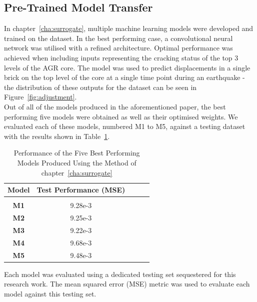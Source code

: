 \subsection{Pre-Trained Model Transfer} \label{TransferModels}

In chapter~\ref{cha:surrogate}, multiple machine learning models were developed and trained on the dataset. In the best performing case, a convolutional neural network was utilised with a refined architecture. Optimal performance was achieved when including inputs representing the cracking status of the top 3 levels of the AGR core. The model was used to predict displacements in a single brick on the top level of the core at a single time point during an earthquake - the distribution of these outputs for the dataset can be seen in Figure~\ref{fig:adjustment}.  
\\

\noindent
Out of all of the models produced in the aforementioned paper, the best performing five models were obtained as well as their optimised weights. We evaluated each of these models, numbered M1 to M5, against a testing dataset with the results shown in Table~\ref{tab:paper1results}.

\begin{table}[h!]
	\begin{center}
		
		\begin{tabular}{c|c|c|r|c} %
			\textbf{Model} & \textbf{Test Performance (MSE)}  \\
			
			\hline
			& \\
			\textbf{M1} &  9.28e-3 \\
			\textbf{M2}   & 9.25e-3 \\ 
			\textbf{M3}  & 9.22e-3  \\
			\textbf{M4} &  9.68e-3 \\
			\textbf{M5} &   9.48e-3  \\
			
			
		\end{tabular}
		\caption{Performance of the Five Best Performing Models Produced Using the Method of chapter~\ref{cha:surrogate}} {Each model was evaluated using a dedicated testing set sequestered for this research work. The mean squared error (MSE) metric was used to evaluate each model against this testing set.}
		\label{tab:paper1results}
		\end{center}
\end{table}

